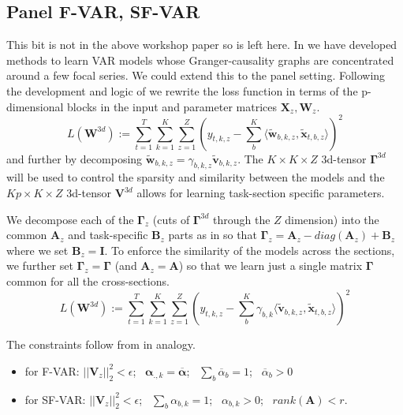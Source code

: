 \documentclass[a4paper]{article}
\newcommand{\vc}[1]{\mathbf{#1}}
\begin{document}
\subsection{Panel F-VAR, SF-VAR}
This bit is not in the above workshop paper so is left here.
In \cite{Gregorova2015} we have developed methods to learn VAR models whose Granger-causality graphs are concentrated around a few focal series. We could extend this to the panel setting. 
Following the development and logic of \cite{Gregorova2015} we rewrite the loss function in terms of the p-dimensional blocks in the input and parameter matrices $\vc{X}_z, \vc{W}_z$.
\begin{equation}\label{eq:SquarredLossBlocks}
\mathit{L}(\vc{W}^{3d}):= \sum_{t=1}^T \sum_{k=1}^K \sum_{z=1}^Z (y_{t,k,z} - \sum_b^K \langle \vc{\tilde{w}}_{b,k,z}, \vc{\tilde{x}}_{t,b,z} \rangle )^2
\end{equation} 
and further by decomposing $\vc{\tilde{w}}_{b,k,z} = \gamma_{b,k,z} \vc{\tilde{v}}_{b,k,z}$. 
The $K \times K \times Z$ 3d-tensor $\vc{\Gamma}^{3d}$ will be used to control the sparsity and similarity between the models and the $Kp \times K \times Z$ 3d-tensor $\vc{V}^{3d}$ allows for learning task-section specific parameters.

We decompose each of the $\vc{\Gamma}_z$ (cuts of $\vc{\Gamma}^{3d}$ through the $Z$ dimension) into the common $\vc{A}_z$ and task-specific $\vc{B}_z$ parts as in \cite{Gregorova2015} so that $\vc{\Gamma}_z = \vc{A}_z - diag(\vc{A}_z) + \vc{B}_z$ where we set $\vc{B}_z = \vc{I}$.
To enforce the similarity of the models across the sections, we further set $\vc{\Gamma}_z = \vc{\Gamma}$ (and $\vc{A}_z = \vc{A}$) so that we learn just a single matrix $\vc{\Gamma}$ common for all the cross-sections.
\begin{equation}\label{eq:SquarredLossBlocks}
\mathit{L}(\vc{W}^{3d}):= \sum_{t=1}^T \sum_{k=1}^K \sum_{z=1}^Z (y_{t,k,z} - \sum_b^K \gamma_{b,k} \langle \vc{\tilde{v}}_{b,k,z}, \vc{\tilde{x}}_{t,b,z} \rangle )^2
\end{equation} 

The constraints follow from \cite{Gregorova2015} in analogy.
\begin{itemize}
\item for F-VAR: $||\vc{V}_z||_2^2 < \epsilon$; \, $\vc{\alpha}_{.,k} = {\overline{\vc{\alpha}}}$; \, $\sum_b {\overline{\alpha}}_b = 1$; \, ${\overline{\alpha}}_b > 0$
\item for SF-VAR: $||\vc{V}_z||_2^2 < \epsilon$; \, $\sum_b \alpha_{b,k} = 1$; \, $\alpha_{b,k} > 0$; \, $rank(\vc{A}) < r$.
\end{itemize}
\end{document}
